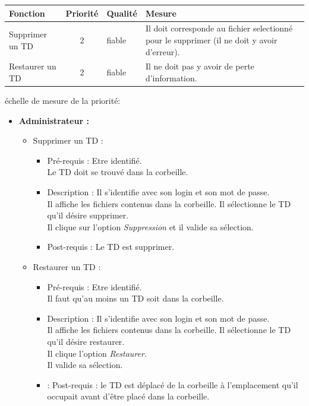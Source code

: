 \begin{tabular}{|p{4cm}|c|p{4cm}|p{5cm}|}
\hline
Fonction & Priorit{\'e} & Qualit{\'e} & Mesure \\
\hline
Supprimer un TD & 2 & fiable & Il doit corresponde au fichier selectionn{\'e} pour le supprimer (il ne doit y avoir d'erreur).\\
\hline
Restaurer un TD & 2 & fiable & Il ne doit pas y avoir de perte d'information.\\
\hline
\end{tabular}
\begin{center}
{\'e}chelle de mesure de la priorit{\'e}:

\end{center}

	\begin{itemize}
	\item {\bf Administrateur :}\\
		\begin{itemize}
		\item Supprimer un TD :
			\begin{itemize}
			\item Pr{\'e}-requis : Etre identifi{\'e}.\\
			Le TD doit se trouv{\'e} dans la corbeille.
			\item Description : Il s'identifie avec son login et son mot de passe.\\
			Il affiche les fichiers contenus dans la corbeille. Il s{\'e}lectionne le TD qu'il d{\'e}sire supprimer.\\
			Il clique sur l'option {\it Suppression} et il valide sa s{\'e}lection.
			\item Post-requis : Le TD est supprimer.\\
			\end{itemize}

		\item Restaurer un TD :
			\begin{itemize}
			\item Pr{\'e}-requis : Etre identifi{\'e}.\\
			Il faut qu'au moins un TD soit dans la corbeille.
			\item Description : Il s'identifie avec son login et son mot de passe.\\
			Il affiche les fichiers contenus dans la corbeille. Il s{\'e}lectionne le TD qu'il d{\'e}sire restaurer.\\
			Il clique l'option {\it Restaurer}.\\
			Il valide sa s{\'e}lection.
			\item : Post-requis : le TD est d{\'e}plac{\'e} de la corbeille {\`a} l'emplacement qu'il occupait avant d'{\^e}tre plac{\'e} dans la corbeille.\\
			\end{itemize}
		\end{itemize}
	\end{itemize}

